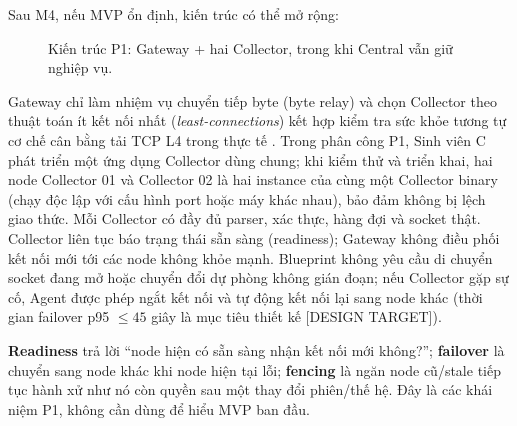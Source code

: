 Sau M4, nếu MVP ổn định, kiến trúc có thể mở rộng:

\begin{figure}[!ht]
\centering
{}
\caption{Kiến trúc P1: Gateway + hai Collector, trong khi Central vẫn giữ nghiệp vụ.}
\label{fig:p1-architecture}
\end{figure}

Gateway chỉ làm nhiệm vụ chuyển tiếp byte (byte relay) và chọn Collector theo thuật toán ít kết nối nhất (\textit{least-connections}) kết hợp kiểm tra sức khỏe tương tự cơ chế cân bằng tải TCP L4 trong thực tế \cite{nginx_tcp_lb}. Trong phân công P1, Sinh viên C phát triển một ứng dụng Collector dùng chung; khi kiểm thử và triển khai, hai node Collector 01 và Collector 02 là hai instance của cùng một Collector binary (chạy độc lập với cấu hình port hoặc máy khác nhau), bảo đảm không bị lệch giao thức. Mỗi Collector có đầy đủ parser, xác thực, hàng đợi và socket thật. Collector liên tục báo trạng thái sẵn sàng (readiness); Gateway không điều phối kết nối mới tới các node không khỏe mạnh. Blueprint không yêu cầu di chuyển socket đang mở hoặc chuyển đổi dự phòng không gián đoạn; nếu Collector gặp sự cố, Agent được phép ngắt kết nối và tự động kết nối lại sang node khác (thời gian failover p95 $\le 45$ giây là mục tiêu thiết kế [DESIGN TARGET]).

\begin{beginnerbox}
\textbf{Readiness} trả lời ``node hiện có sẵn sàng nhận kết nối mới không?''; \textbf{failover} là chuyển sang node khác khi node hiện tại lỗi; \textbf{fencing} là ngăn node cũ/stale tiếp tục hành xử như nó còn quyền sau một thay đổi phiên/thế hệ. Đây là các khái niệm P1, không cần dùng để hiểu MVP ban đầu.
\end{beginnerbox}

